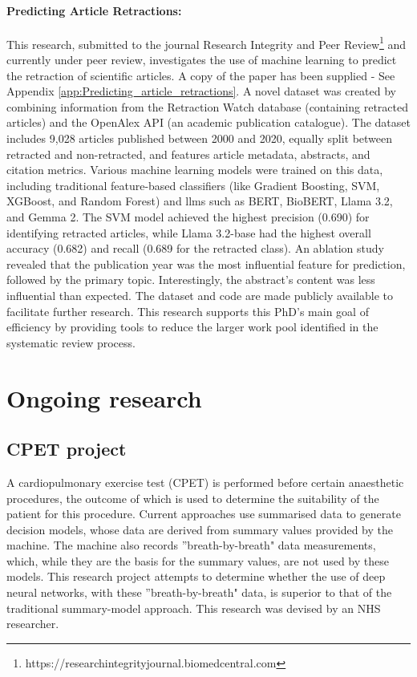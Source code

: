 \documentclass[10pt,oneside]{book}
\begin{document}
\paragraph{Predicting Article Retractions: } This research, submitted to the journal Research Integrity and Peer Review\footnote{https://researchintegrityjournal.biomedcentral.com} and currently under peer review, investigates the use of machine learning to predict the retraction of scientific articles. A copy of the paper has been supplied - See Appendix \ref{app:Predicting_article_retractions}. A novel dataset was created by combining information from the Retraction Watch database (containing retracted articles) and the OpenAlex API (an academic publication catalogue). The dataset includes 9,028 articles published between 2000 and 2020, equally split between retracted and non-retracted, and features article metadata, abstracts, and citation metrics. Various machine learning models were trained on this data, including traditional feature-based classifiers (like Gradient Boosting, SVM, XGBoost, and Random Forest) and \gls*{llm}s such as BERT, BioBERT, Llama 3.2, and Gemma 2. The SVM model achieved the highest precision (0.690) for identifying retracted articles, while Llama 3.2-base had the highest overall accuracy (0.682) and recall (0.689 for the retracted class). An ablation study revealed that the publication year was the most influential feature for prediction, followed by the primary topic. Interestingly, the abstract's content was less influential than expected. The dataset and code are made publicly available to facilitate further research. This research supports this PhD's main goal of efficiency by providing tools to reduce the larger work pool identified in the systematic review process.

\section{Ongoing research}

\subsection{CPET project}

A cardiopulmonary exercise test (CPET) is performed before certain anaesthetic procedures, the outcome of which is used to determine the suitability of the patient for this procedure. Current approaches use summarised data to generate decision models, whose data are derived from summary values provided by the machine. The machine also records ''breath-by-breath" data measurements, which, while they are the basis for the summary values, are not used by these models. This research project attempts to determine whether the use of deep neural networks, with these ''breath-by-breath" data, is superior to that of the traditional summary-model approach. This research was devised by an NHS researcher.
\end{document}
